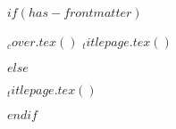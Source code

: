 $if(has-frontmatter)$
\begin{frontmatter}
\begin{titlepage}
$_cover.tex()$%
$_titlepage.tex()$
  
\end{titlepage}
\setcounter{page}{1}
\end{frontmatter}
$else$
\begin{titlepage}
$_titlepage.tex()$
  
\end{titlepage}
$endif$

  
